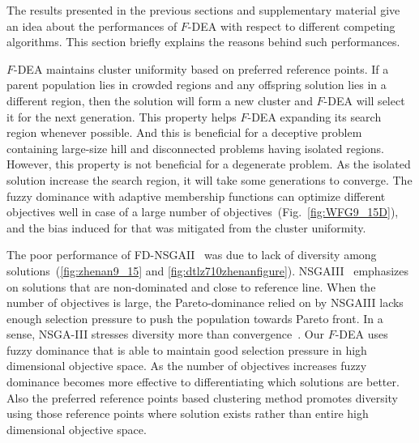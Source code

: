 \documentclass[review]{elsarticle}
\begin{document}
The results presented in the previous sections and supplementary material give an idea about the performances of $F$-DEA with respect to different competing algorithms. This section briefly explains the reasons behind such performances.

$F$-DEA maintains cluster uniformity based on preferred reference points. If a parent population lies in crowded regions
and any offspring solution lies in a different region, then the solution will form a new cluster and  $F$-DEA will
select it for the next generation. %
This property  helps $F$-DEA expanding its search region whenever possible. And this is beneficial for
a deceptive problem containing large-size hill and disconnected problems having isolated regions.
However, this property is not beneficial for a degenerate problem. As the isolated solution increase the  search region, it will take some generations to converge. 
The fuzzy dominance with adaptive membership functions can optimize different objectives well in case of a large number of objectives~(Fig.~\ref{fig:WFG9_15D}), and the bias induced for that was mitigated from the cluster uniformity.

The poor performance of FD-NSGAII~\citep{he2012new} was due to lack of diversity among solutions~(\ref{fig:zhenan9_15} and \ref{fig:dtlz710zhenanfigure}).
NSGAIII~\citep{deb2014evolutionary} emphasizes on solutions that are non-dominated and close to reference line. When the number of objectives is large,
the Pareto-dominance relied on by NSGAIII lacks enough selection pressure to push the population towards Pareto front.
In a sense, NSGA-III stresses diversity more than convergence~\citep{thetadominance7080938}. %
Our $F$-DEA uses fuzzy dominance that is able to maintain good selection pressure in high dimensional objective space. As the number of objectives increases fuzzy dominance becomes more effective to differentiating which solutions are better. Also the preferred reference points based clustering method promotes diversity using those reference points where solution exists rather than entire high dimensional objective space.
 
\end{document}
